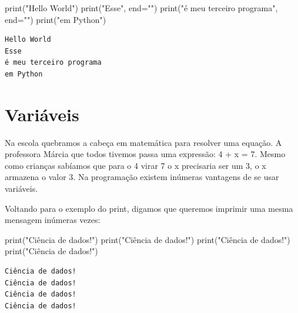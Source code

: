 \documentclass[
  letterpaper,
  DIV=11,
  numbers=noendperiod]{scrreprt}
\newenvironment{Shaded}{\begin{snugshade}}{\end{snugshade}}
\newcommand{\BuiltInTok}[1]{\textcolor[rgb]{0.00,0.23,0.31}{#1}}
\newcommand{\NormalTok}[1]{\textcolor[rgb]{0.00,0.23,0.31}{#1}}
\newcommand{\OperatorTok}[1]{\textcolor[rgb]{0.37,0.37,0.37}{#1}}
\newcommand{\StringTok}[1]{\textcolor[rgb]{0.13,0.47,0.30}{#1}}
\begin{document}
\begin{Shaded}
\begin{Highlighting}[]
\BuiltInTok{print}\NormalTok{(}\StringTok{"Hello World"}\NormalTok{)}
\BuiltInTok{print}\NormalTok{(}\StringTok{"Esse"}\NormalTok{, end}\OperatorTok{=}\StringTok{""}\NormalTok{)}
\BuiltInTok{print}\NormalTok{(}\StringTok{"é meu terceiro programa"}\NormalTok{, end}\OperatorTok{=}\StringTok{""}\NormalTok{)}
\BuiltInTok{print}\NormalTok{(}\StringTok{"em Python"}\NormalTok{)}
\end{Highlighting}
\end{Shaded}

\begin{tcolorbox}[enhanced jigsaw, breakable, leftrule=.75mm, left=2mm, opacityback=0, bottomrule=.15mm, toprule=.15mm, rightrule=.15mm, arc=.35mm, colback=white]

\begin{verbatim}
Hello World
Esse
é meu terceiro programa
em Python
\end{verbatim}

\end{tcolorbox}


\hypertarget{variuxe1veis}{%
\chapter{Variáveis}\label{variuxe1veis}}

Na escola quebramos a cabeça em matemática para resolver uma equação. A
professora Márcia que todos tivemos passa uma expressão: 4 + x = 7.
Mesmo como crianças sabíamos que para o 4 virar 7 o x precisaria ser um
3, o x armazena o valor 3. Na programação existem inúmeras vantagens de
se usar variáveis.

Voltando para o exemplo do print, digamos que queremos imprimir uma
mesma mensagem inúmeras vezes:

\begin{Shaded}
\begin{Highlighting}[]
\BuiltInTok{print}\NormalTok{(}\StringTok{"Ciência de dados!"}\NormalTok{)}
\BuiltInTok{print}\NormalTok{(}\StringTok{"Ciência de dados!"}\NormalTok{)}
\BuiltInTok{print}\NormalTok{(}\StringTok{"Ciência de dados!"}\NormalTok{)}
\BuiltInTok{print}\NormalTok{(}\StringTok{"Ciência de dados!"}\NormalTok{)}
\end{Highlighting}
\end{Shaded}

\begin{tcolorbox}[enhanced jigsaw, breakable, leftrule=.75mm, left=2mm, opacityback=0, bottomrule=.15mm, toprule=.15mm, rightrule=.15mm, arc=.35mm, colback=white]

\begin{verbatim}
Ciência de dados!
Ciência de dados!
Ciência de dados!
Ciência de dados!
\end{verbatim}

\end{tcolorbox}
\end{document}
